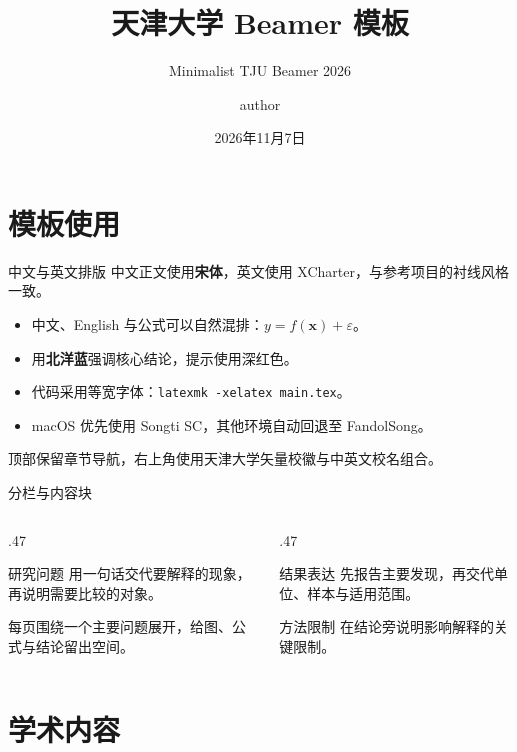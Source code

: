 \documentclass[10pt,aspectratio=169]{beamer}
\title[天津大学 Beamer]{天津大学 Beamer 模板}
\subtitle{Minimalist TJU Beamer 2026}
\author[author]{author}
\institute{天津大学\quad 马寅初经济学院}
\date{2026年11月7日}
\begin{document}
\begin{frame}[plain]
  \titlepage
\end{frame}

\section{模板使用}

\begin{frame}{中文与英文排版}
  中文正文使用\textbf{宋体}，英文使用 XCharter，与参考项目的衬线风格一致。
  \medskip
  \begin{itemize}\setlength{\itemsep}{.65em}
    \item 中文、English 与公式可以自然混排：$y=f(\bm{x})+\varepsilon$。
    \item 用\textcolor{tju}{\textbf{北洋蓝}}强调核心结论，\alert{提示}使用深红色。
    \item 代码采用等宽字体：\texttt{latexmk -xelatex main.tex}。
    \item macOS 优先使用 Songti SC，其他环境自动回退至 FandolSong。
  \end{itemize}
  \medskip
  顶部保留章节导航，右上角使用天津大学矢量校徽与中英文校名组合。
\end{frame}

\begin{frame}{分栏与内容块}
  \begin{columns}[T,onlytextwidth]
    \begin{column}{.47\textwidth}
      \begin{block}{研究问题}
        用一句话交代要解释的现象，再说明需要比较的对象。
      \end{block}
      \medskip
      每页围绕一个主要问题展开，给图、公式与结论留出空间。
    \end{column}
    \begin{column}{.47\textwidth}
      \begin{exampleblock}{结果表达}
        先报告主要发现，再交代单位、样本与适用范围。
      \end{exampleblock}
      \begin{alertblock}{方法限制}
        在结论旁说明影响解释的关键限制。
      \end{alertblock}
    \end{column}
  \end{columns}
\end{frame}

\section{学术内容}
\end{document}
